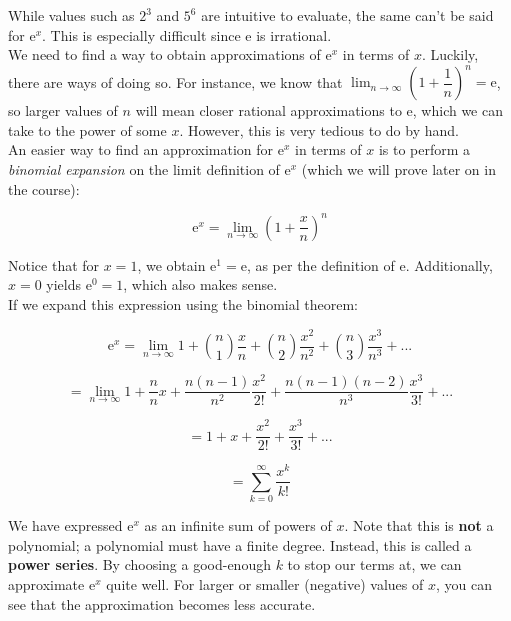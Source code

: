 \documentclass[12pt, a4paper, titlepage, twoside]{article}
\newcommand*{\e}{\textrm{e}}
\begin{document}
	\begin{fr}[Expressing \boldmath $\e^x$ as a power series]
		\label{fr:ex-pseries}
		While values such as $2^3$ and $5^6$ are intuitive to evaluate, the same can't be said for $\e^x$. This is especially
		difficult since $\e$ is irrational.\\
	
		We need to find a way to obtain approximations of $\e^x$ in terms of $x$. Luckily, there are ways of doing so. For instance,
		we know that $\displaystyle \lim_{n \to \infty} \left(1+\dfrac{1}{n}\right)^n = \e$, so larger values of $n$ will mean closer rational
		approximations to $\e$, which we can take to the power of some $x$. However, this is very tedious to do by hand.\\
		
		An easier way to find an approximation for $\e^x$ in terms of $x$ is to perform a \textit{binomial expansion} on the limit
		definition of $\e^x$ (which we will prove later on in the course):
		
		$$\e^x = \lim_{n \to \infty} \left(1+\dfrac{x}{n}\right)^n$$
		
		\hfill
		
		Notice that for $x=1$, we obtain $\e^1 = \e$, as per the definition of $\e$. Additionally, $x=0$ yields $\e^0 = 1$, which also makes
		sense.\\
		
		If we expand this expression using the binomial theorem:
		
		$$\e^x = \lim_{n \to \infty} 1 + {n \choose 1} \dfrac{x}{n} + {n \choose 2} \dfrac{x^2}{n^2} + {n \choose 3} \dfrac{x^3}{n^3} + ...$$
		
		$$= \lim_{n \to \infty} 1 + \dfrac{n}{n} x + \dfrac{n(n-1)}{n^2} \dfrac{x^2}{2!} + \dfrac{n(n-1)(n-2)}{n^3} \dfrac{x^3}{3!} + ...$$
		
		$$= 1 + x + \dfrac{x^2}{2!} + \dfrac{x^3}{3!} + ...$$
		
		$$= \sum_{k=0}^{\infty} \dfrac{x^k}{k!}$$
		
		\hfill
		
		We have expressed $\e^x$ as an infinite sum of powers of $x$. Note that this is \textbf{not} a polynomial; a polynomial must have a 
		finite degree. Instead, this is called a \textbf{power series}. By choosing a good-enough $k$ to stop our terms 
		at, we can approximate $\e^x$ quite well. For larger or smaller (negative) values of $x$, you can see that the approximation becomes 
		less accurate.
	\end{fr}
	
\end{document}
